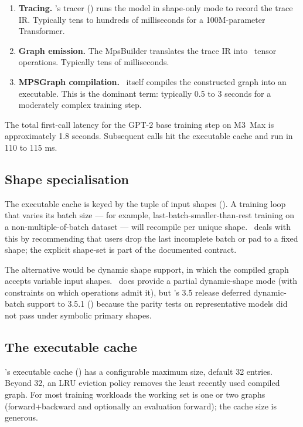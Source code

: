 \begin{enumerate}
  \item \textbf{Tracing.} \Lucid's tracer
    () runs the model in shape-only mode to
    record the trace IR. Typically tens to hundreds of milliseconds
    for a 100M-parameter Transformer.
  \item \textbf{Graph emission.} The MpsBuilder translates the
    trace IR into \MPSGraph\ tensor operations. Typically tens of
    milliseconds.
  \item \textbf{MPSGraph compilation.} \MPSGraph\ itself compiles
    the constructed graph into an executable. This is the dominant
    term: typically 0.5 to 3 seconds for a moderately complex
    training step.
\end{enumerate}

The total first-call latency for the GPT-2 base training step on
M3~Max is approximately 1.8 seconds. Subsequent calls hit the
executable cache and run in 110 to 115 ms.

\subsection{Shape specialisation}
\label{ssec:metal_mpsgraph:shape_spec}

The executable cache is keyed by the tuple of input shapes
(). A training loop that varies its
batch size --- for example, last-batch-smaller-than-rest training
on a non-multiple-of-batch dataset --- will recompile per unique
shape. \Lucid\ deals with this by recommending that users drop the
last incomplete batch or pad to a fixed shape; the explicit
shape-set is part of the documented contract.

The alternative would be dynamic shape support, in which the
compiled graph accepts variable input shapes. \MPSGraph\ does
provide a partial dynamic-shape mode (with constraints on which
operations admit it), but \Lucid's 3.5 release deferred
dynamic-batch support to 3.5.1
() because the parity tests on
representative models did not pass under symbolic primary shapes.

\subsection{The executable cache}
\label{ssec:metal_mpsgraph:exec_cache}

\Lucid's executable cache () has a configurable
maximum size, default 32 entries. Beyond 32, an LRU eviction policy
removes the least recently used compiled graph. For most training
workloads the working set is one or two graphs (forward+backward and
optionally an evaluation forward); the cache size is generous.

